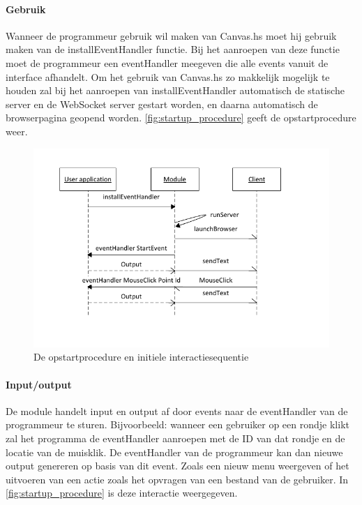 \paragraph{Gebruik} Wanneer de programmeur gebruik wil maken van Canvas.hs moet hij gebruik maken van de installEventHandler functie. Bij het aanroepen van deze functie moet de programmeur een eventHandler meegeven die alle events vanuit de interface afhandelt. Om het gebruik van Canvas.hs zo makkelijk mogelijk te houden zal bij het aanroepen van installEventHandler automatisch de statische server en de WebSocket server gestart worden, en daarna automatisch de browserpagina geopend worden. \autoref{fig:startup_procedure} geeft de opstartprocedure weer.

\begin{figure}
\begin{center}
\includegraphics[keepaspectratio,width=\textwidth]{./images/module_startup_procedure_interaction.pdf}
\caption{De opstartprocedure en initiele interactiesequentie}
\label{fig:startup_procedure}
\end{center}
\end{figure}

\paragraph{Input/output}
De module handelt input en output af door events naar de eventHandler van de programmeur te sturen. Bijvoorbeeld: wanneer een gebruiker op een rondje klikt zal het programma de eventHandler aanroepen met de ID van dat rondje en de locatie van de muisklik. De eventHandler van de programmeur kan dan nieuwe output genereren op basis van dit event. Zoals een nieuw menu weergeven of het uitvoeren van een actie zoals het opvragen van een bestand van de gebruiker. In \autoref{fig:startup_procedure} is deze interactie weergegeven.

